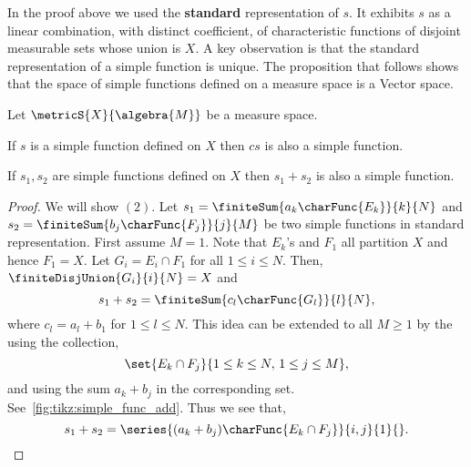 In the proof above we used the \textbf{standard} representation of $s$. It exhibits $s$ as a linear 
combination, with distinct coefficient, of characteristic functions of disjoint measurable sets whose union 
is $X$. A key observation is that the standard representation of a simple function is unique. The proposition
that follows shows that the space of simple functions defined on a measure space is a Vector space.
\begin{Proposition}\label{prop:prop_simple_func}
    Let $\metricS{X}{\algebra{M}}$ be a measure space. 
    \begin{properties}
    \item
	If $s$ is a simple function defined on $X$ then $cs$ is also a simple function.
    \item
	If $s_1,s_2$ are  simple functions defined on $X$ then $s_1 + s_2$ is also a simple function.
    \end{properties}
\end{Proposition}
\begin{proof}
    We will show $(2)$. Let $s_1 = \finiteSum{a_k\charFunc{E_k}}{k}{N}$ and $s_2 =
    \finiteSum{b_j\charFunc{F_j}}{j}{M}$ be two simple functions in standard representation. 
    First assume $M=1$. Note that $E_k$'s and $F_1$ all partition $X$ and hence $F_1 = X$. Let $G_i = E_i\cap
    F_1$ for all $1\leq i \leq N$. Then, $\finiteDisjUnion{G_i}{i}{N} = X$ and 
    \[s_1 + s_2 = \finiteSum{c_l\charFunc{G_l}}{l}{N},\]
    where $c_l = a_l + b_1$ for $1\leq l \leq N$. This idea can be extended to all $M \geq 1$ by the using the
    collection,
    \[\set{E_k\cap F_j}{1\leq k \leq N,\, 1\leq j \leq M},\]
    and using the sum $a_k + b_j$ in the corresponding set. See~\ref{fig:tikz:simple_func_add}. Thus we see
    that,
    \[s_1 + s_2 = \series{(a_k + b_j)\charFunc{E_k\cap F_j}}{i,j}{1}{}.\]
\end{proof}


